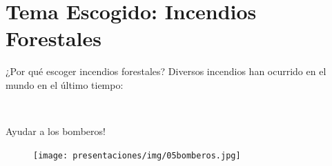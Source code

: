 \section{Tema Escogido: Incendios Forestales}
\begin{frame}{¿Por qué escoger incendios forestales?}
Diversos incendios han ocurrido en el mundo en el último tiempo:
    \begin{figure}
        \
        \
    \end{figure}
\end{frame}
\begin{frame}{Ayudar a los bomberos!}
    \begin{figure}
        \centering
        \texttt{[image: presentaciones/img/05bomberos.jpg]}
    \end{figure}
\end{frame}

